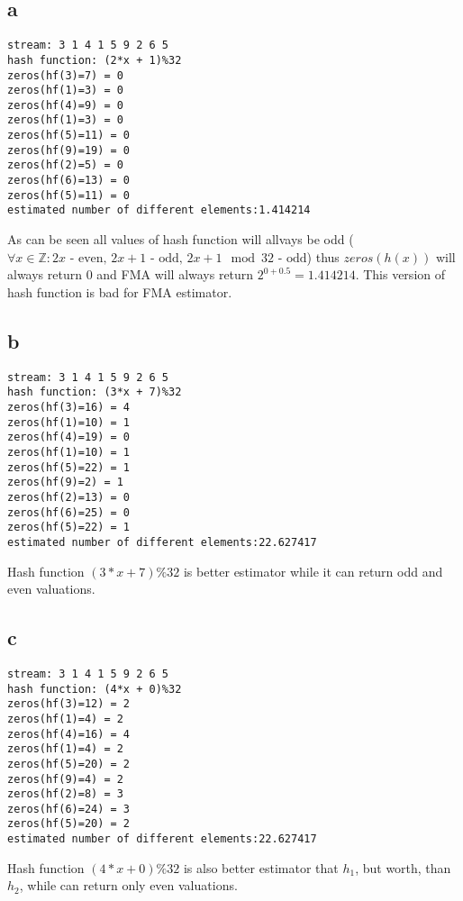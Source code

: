 \subsection*{a}
\begin{verbatim}
stream: 3 1 4 1 5 9 2 6 5 
hash function: (2*x + 1)%32
zeros(hf(3)=7) = 0
zeros(hf(1)=3) = 0
zeros(hf(4)=9) = 0
zeros(hf(1)=3) = 0
zeros(hf(5)=11) = 0
zeros(hf(9)=19) = 0
zeros(hf(2)=5) = 0
zeros(hf(6)=13) = 0
zeros(hf(5)=11) = 0
estimated number of different elements:1.414214
\end{verbatim}
As can be seen all values of hash function will allvays be odd ($\forall x \in \mathbb{Z}: 2x\text{ - even, }2x+1\text{ - odd, }2x+1\mod32\text{ - odd}$) thus $zeros(h(x))$ will always return 0 and FMA will always return $2^{0 + 0.5}=1.414214$. This version of hash function is bad for FMA estimator.

\subsection*{b}
\begin{verbatim}
stream: 3 1 4 1 5 9 2 6 5 
hash function: (3*x + 7)%32
zeros(hf(3)=16) = 4
zeros(hf(1)=10) = 1
zeros(hf(4)=19) = 0
zeros(hf(1)=10) = 1
zeros(hf(5)=22) = 1
zeros(hf(9)=2) = 1
zeros(hf(2)=13) = 0
zeros(hf(6)=25) = 0
zeros(hf(5)=22) = 1
estimated number of different elements:22.627417
\end{verbatim}
Hash function $(3*x + 7)\%32$ is better estimator while it can return odd and even valuations.

\subsection*{c}
\begin{verbatim}
stream: 3 1 4 1 5 9 2 6 5 
hash function: (4*x + 0)%32
zeros(hf(3)=12) = 2
zeros(hf(1)=4) = 2
zeros(hf(4)=16) = 4
zeros(hf(1)=4) = 2
zeros(hf(5)=20) = 2
zeros(hf(9)=4) = 2
zeros(hf(2)=8) = 3
zeros(hf(6)=24) = 3
zeros(hf(5)=20) = 2
estimated number of different elements:22.627417
\end{verbatim}
Hash function $(4*x + 0)\%32$ is also better estimator that $h_1$, but worth, than $h_2$, while can return only even valuations.
